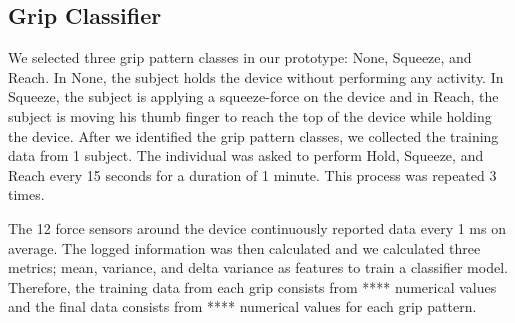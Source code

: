 \subsection{Grip Classifier}
We selected three grip pattern classes in our prototype: None, Squeeze, and Reach. In None, the subject holds the device without performing any activity. In Squeeze, the subject is applying a squeeze-force on the device and in Reach, the subject is moving his thumb finger to reach the top of the device while holding the device. After we identified the grip pattern classes, we collected the training data from 1 subject. The individual was asked to perform Hold, Squeeze, and Reach every 15 seconds for a duration of 1 minute. This process was repeated 3 times. 
\par
The 12 force sensors around the device continuously reported data every 1 ms on average. The logged information was then calculated  and we calculated three metrics; mean, variance, and delta variance as features to train a classifier model. Therefore, the training data from each grip consists from **** numerical values and the final data consists from **** numerical values for each grip pattern.



    